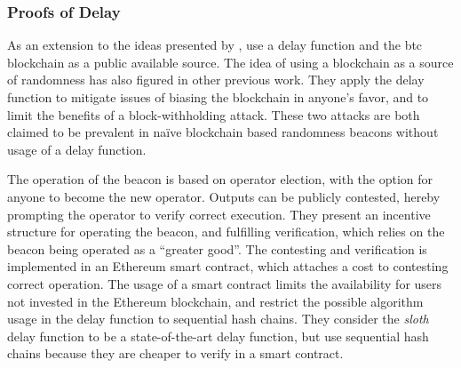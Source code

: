 \subsubsection{Proofs of Delay}%
\label{ssub:proofs_of_delay}

As an extension to the ideas presented by \citet{randomzoo}, \citet{bunz2017proofsof} use a delay function and the \gls{btc} blockchain as a public available source. The idea of using a blockchain as a source of randomness has also figured in other previous work.
They apply the delay function to mitigate issues of biasing the blockchain in anyone's favor, and to limit the benefits of a block-withholding attack.
These two attacks are both claimed to be prevalent in naïve blockchain based randomness beacons without usage of a delay function.

The operation of the beacon is based on operator election, with the option for anyone to become the new operator.
Outputs can be publicly contested, hereby prompting the operator to verify correct execution.
They present an incentive structure for operating the beacon, and fulfilling verification, which relies on the beacon being operated as a \enquote{greater good}.
The contesting and verification is implemented in an Ethereum smart contract, which attaches a cost to contesting correct operation.
The usage of a smart contract limits the availability for users not invested in the Ethereum blockchain, and restrict the possible algorithm usage in the delay function to sequential hash chains.
They consider the \textit{sloth} delay function to be a state-of-the-art delay function, but use sequential hash chains because they are cheaper to verify in a smart contract.
